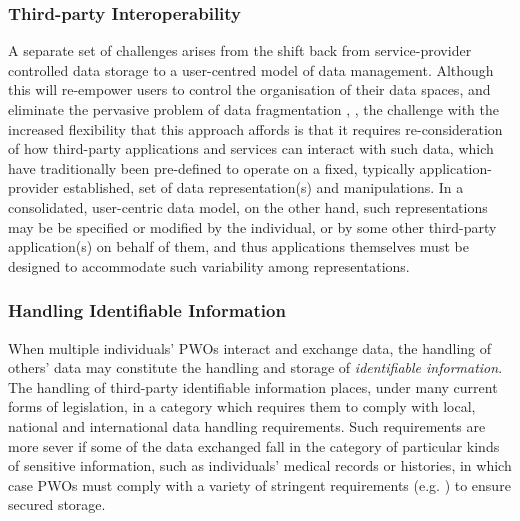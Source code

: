 \documentclass{sig-alternate}
\begin{document}
\subsubsection{Third-party Interoperability}

A separate set of challenges arises from the shift back from service-provider controlled data storage to a user-centred model of data management. Although this will re-empower users to control the organisation of their data spaces, and eliminate the pervasive problem of data fragmentation \cite{karger2006data}, \cite{heath2011linked}, the challenge with the increased flexibility that this approach affords is that it requires re-consideration of how third-party applications and services can interact with such data, which have traditionally been pre-defined to operate on a fixed, typically application-provider established, set of data representation(s) and manipulations.  In a consolidated, user-centric data model, on the other hand, such representations may be be specified or modified by the individual, or by some other third-party application(s) on behalf of them, and thus applications themselves must be designed to accommodate such variability among representations.

\subsubsection{Handling Identifiable Information}

When multiple individuals' PWOs interact and exchange data, the handling of others' data may constitute the handling and storage of \emph{identifiable information}\cite{narayanan2010myths}. The handling of third-party identifiable information places, under many current forms of legislation, in a category which requires them to comply with local, national and international data handling requirements. Such requirements are more sever if some of the data exchanged fall in the category of particular kinds of sensitive information, such as individuals' medical records or histories, in which case PWOs must comply with a variety of stringent requirements (e.g. \cite{banisar1999global}) to ensure secured storage.  

\end{document}
